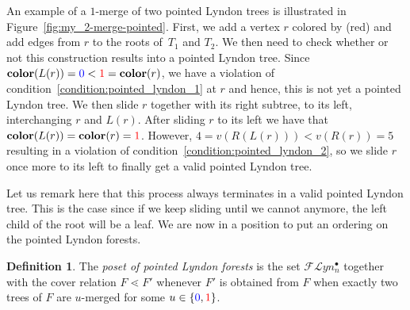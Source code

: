 \documentclass[11pt]{article}
\theoremstyle{definition}
\newtheorem{defi}[theo]{Definition}
\numberwithin{equation}{section}
\newcommand{\Flyn}{\mathcal{FL}yn}
\newcommand{\clr}{\mathbf{color}}
\newcommand{\tre}[1]{{\color{red}{#1}}}
\newcommand{\tbl}[1]{{\color{blue}{#1}}}
\begin{document}
  An example of a $1$-merge of two pointed Lyndon trees is illustrated in Figure~\ref{fig:my_2-merge-pointed}. First,  we add a vertex $r$ colored by \tre{1} (red) and add edges from $r$ to the roots of~$T_1$ and $T_2$.  We then need to check whether or not this construction results into a pointed Lyndon tree. Since $\clr(L(r))=\tbl{0}<\tre{1}=\clr(r)$, we  have a violation of condition~\eqref{condition:pointed_lyndon_1} at $r$ and hence, this is not yet a pointed Lyndon tree. We then slide $r$ together with its right subtree, to its left, interchanging $r$ and $L(r)$. After sliding $r$ to its left we have that $\clr(L(r))=\clr(r)=\tre{1}$. However,  $4=v(R(L(r)))<v(R(r))=5$ resulting in a violation of condition~\eqref{condition:pointed_lyndon_2}, so we slide $r$ once more to its left to finally get a valid pointed Lyndon tree.
 
Let us remark here that this process always terminates in  a valid pointed Lyndon tree.  This is the case since if we keep sliding until we cannot anymore, the left child of the root will be a leaf. We are  now in a position to put an ordering on the pointed Lyndon forests.

 \begin{defi}   The \emph{poset of pointed Lyndon forests} is the set $\Flyn_{n}^{\bullet}$ together with the  cover relation $F\lessdot F'$   whenever $F'$ is obtained from $F$ when exactly two trees of $F$ are $u$-merged for some $u\in\left\{\tbl{0},\tre{1}\right\}$.
\end{defi}
\end{document}
